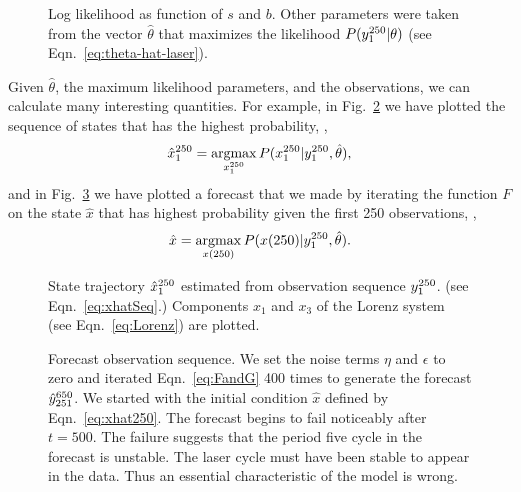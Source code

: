 \begin{figure}[htbp]
  \caption[Log likelihood as function of $s$ and $b$.]%
  {Log likelihood as function of $s$ and $b$.  Other parameters were
    taken from the vector $\hat \theta$ that maximizes the likelihood
    $P(y_{1}^{250}|\theta)$ (see Eqn.~\eqref{eq:theta-hat-laser}).}
  \label{fig:LaserLogLike}
\end{figure}

Given $\hat \theta$, the maximum likelihood parameters, and the
observations, we can calculate many interesting quantities.  For
example, in Fig.~\ref{fig:LaserStates} we have plotted the sequence of
states that has the highest probability, \ie,
\begin{equation}
  \label{eq:xhatSeq}
  \hat x_{1}^{250} = \operatorname*{argmax}_{x_{1}^{250}}
  P(x_{1}^{250}|y_{1}^{250},\hat \theta),
\end{equation}
and in Fig.~\ref{fig:LaserForecast} we have plotted a forecast that we
made by iterating the function $F$ on the state $\hat x$ that has
highest probability given the first 250 observations, \ie,
\begin{equation}
  \label{eq:xhat250}
  \hat x = \operatorname*{argmax}_{{x}{(250)}} P({x}{(250)}|y_{1}^{250},\hat \theta).
\end{equation}

\begin{figure}[htbp]
  \caption[State trajectory $\ts{\hat x}{1}{250}$.]%
  {State trajectory $\ts{\hat x}{1}{250}$ estimated from
    observation sequence $y_{1}^{250}$. (see
    Eqn.~\eqref{eq:xhatSeq}.)  Components $x_1$ and $x_3$ of the
    Lorenz system (see Eqn.~\eqref{eq:Lorenz}) are plotted.}
  \label{fig:LaserStates}
\end{figure}

\begin{figure}[htbp]
  \caption[Forecast observation sequence.]%
  {Forecast observation sequence.  We set the noise terms $\eta$ and
    $\epsilon$ to zero and iterated Eqn.~\eqref{eq:FandG} 400 times to
    generate the forecast $\hat y_{251}^{650}$.  We started with
    the initial condition $\hat x$ defined by Eqn.~\eqref{eq:xhat250}.
    The forecast begins to fail noticeably after $t=500$.  The failure
    suggests that the period five cycle in the forecast is unstable.
    The laser cycle must have been stable to appear in the data.  Thus
    an essential characteristic of the model is wrong.}
  \label{fig:LaserForecast}
\end{figure}


